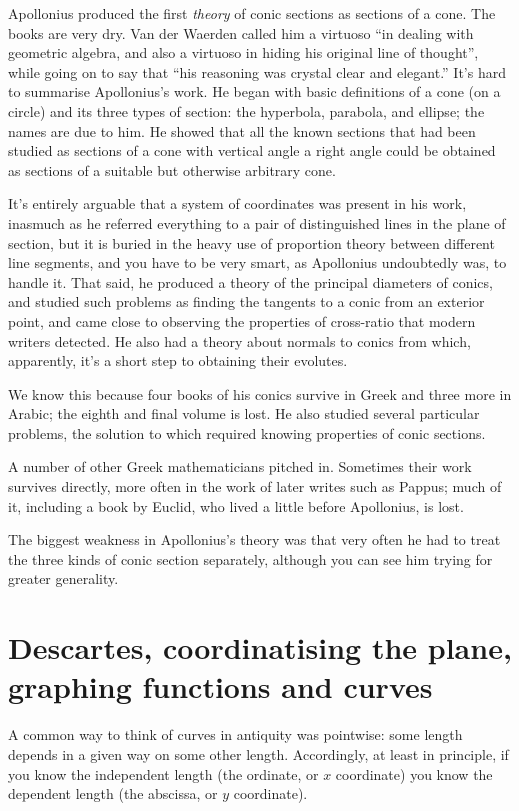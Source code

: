 \documentclass[11pt]{book}
\begin{document}
Apollonius produced the first \emph{theory} of conic sections as sections of a cone. The books are very dry. Van der Waerden called him a virtuoso ``in dealing with geometric algebra, and also a virtuoso in hiding his original line of thought'', while going on to say that ``his reasoning was crystal clear and elegant.'' It's hard to summarise Apollonius's work. He began with basic definitions of a cone (on a circle) and its three types of section: the hyperbola, parabola, and ellipse; the names are due to him. He showed that all the known sections that had been studied as sections of a cone with vertical angle a right angle could be obtained as sections of a suitable but otherwise arbitrary cone.  

It's entirely arguable that a system of coordinates was present in his work, inasmuch as he referred everything to a pair of distinguished lines in the plane of section, but it is buried in the heavy use of proportion theory between different line segments, and you have to be very smart, as Apollonius undoubtedly was, to handle it. That said, he produced a theory of the principal diameters of conics, and studied such problems as finding the tangents to a conic from an exterior point, and came close to observing the properties of cross-ratio that modern writers detected. He also had a theory about normals to conics from which, apparently, it's a short step to obtaining their evolutes. 

We know this because four books of his conics survive in Greek and three more in Arabic; the eighth and final volume is lost. He also studied several particular problems, the solution to which required knowing properties of conic sections.  

A number of other Greek mathematicians pitched in. Sometimes their work survives directly, more often in the work of later writes such as Pappus; much of it, including a book by Euclid, who lived a little before Apollonius, is lost. 

The biggest weakness in Apollonius's theory was that very often he had to treat the three kinds of conic section separately, although you can see him trying for greater generality.

\section{Descartes,  coordinatising the plane,  graphing functions and curves}
A common way to think of curves in antiquity was pointwise: some length depends in a given way on some other length. Accordingly, at least in principle, if you know the independent length
(the ordinate, or $x$ coordinate) you know the dependent length (the abscissa, or $y$ coordinate).  
\end{document}
